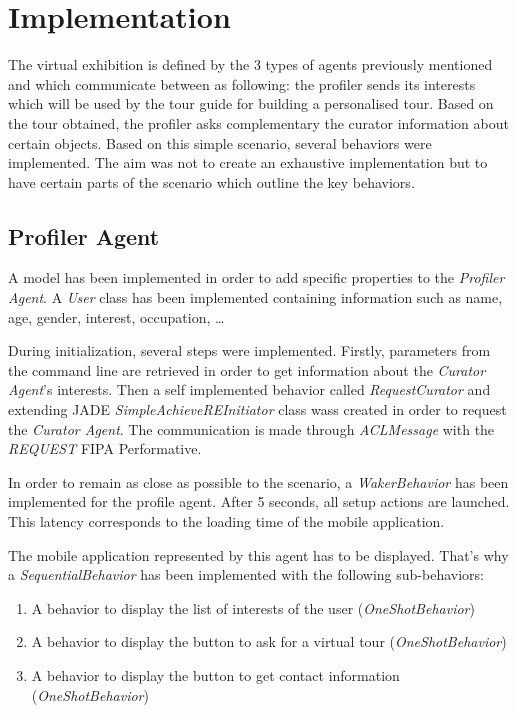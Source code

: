 \documentclass[a4paper,11pt]{article}
\begin{document}
  \newcommand{\pa}{\textit{Profiler Agent}}
  \newcommand{\cu}{\textit{Curator Agent}}
  \renewcommand{\to}{\textit{Tour Guide Agent}}
  
  \section{Implementation}
  
  The virtual exhibition is defined by the 3 types of agents previously mentioned and which communicate between as following: the profiler sends its
  interests which will be used by the tour guide for building a personalised tour. Based on the tour obtained, the profiler asks complementary
  the curator information about certain objects. Based on this simple scenario, several behaviors were implemented. The aim was not to create an
  exhaustive implementation but to have certain parts of the scenario which outline the key behaviors.
  
  \subsection{Profiler Agent}
  
  A model has been implemented in order to add specific properties to the \pa{}. A \textit{User} class has been implemented containing information 
  such as name, age, gender, interest, occupation, \dots{}
  
  During initialization, several steps were implemented. Firstly, parameters from the command line are retrieved in order 
  to get information about the \cu{}'s interests. Then a self implemented behavior called \textit{RequestCurator} and extending JADE \textit{SimpleAchieveREInitiator} 
  class wass created in order to request the \cu{}. The communication is made through \textit{ACLMessage} with the \textit{REQUEST} 
  FIPA Performative.
  
  In order to remain as close as possible to the scenario, a \textit{WakerBehavior} has been implemented for the profile agent. After 5 seconds, 
  all setup actions are launched. This latency corresponds to the loading time of the mobile application.
  
  The mobile application represented by this agent has to be displayed. That's why a \textit{SequentialBehavior} has been implemented with the following 
  sub-behaviors:
  \vspace{-15pt}
  \begin{enumerate}
   \item A behavior to display the list of interests of the user (\textit{OneShotBehavior})
   \item A behavior to display the button to ask for a virtual tour (\textit{OneShotBehavior})
   \item A behavior to display the button to get contact information (\textit{OneShotBehavior})
  \end{enumerate}
  
\end{document}
